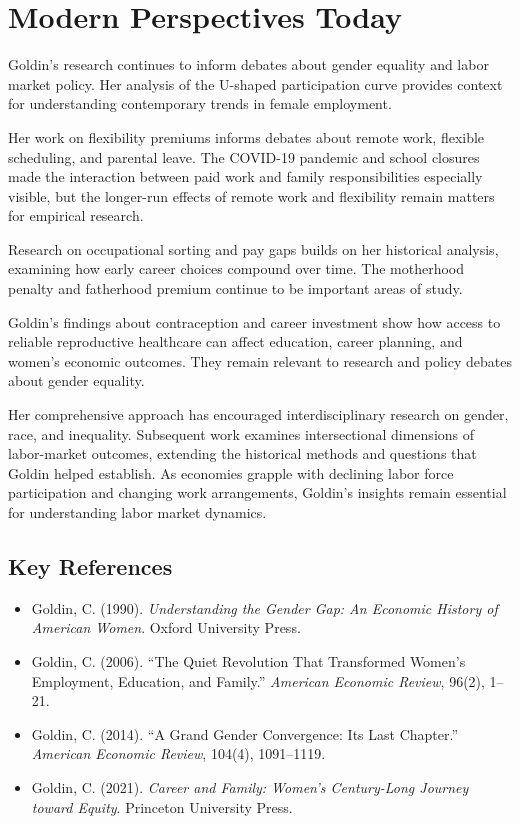 \section{Modern Perspectives Today}
Goldin's research continues to inform debates about gender equality and labor
market policy. Her analysis of the U-shaped participation curve provides
context for understanding contemporary trends in female employment.

Her work on flexibility premiums informs debates about remote work, flexible
scheduling, and parental leave. The COVID-19 pandemic and school closures made
the interaction between paid work and family responsibilities especially visible,
but the longer-run effects of remote work and flexibility remain matters for
empirical research.

Research on occupational sorting and pay gaps builds on her historical analysis,
examining how early career choices compound over time. The motherhood penalty
and fatherhood premium continue to be important areas of study.

Goldin's findings about contraception and career investment show how access to
reliable reproductive healthcare can affect education, career planning, and
women's economic outcomes. They remain relevant to research and policy debates
about gender equality.

Her comprehensive approach has encouraged interdisciplinary research on gender,
race, and inequality. Subsequent work examines intersectional dimensions of
labor-market outcomes, extending the historical methods and questions that
Goldin helped establish.
As economies grapple with declining labor force participation and changing work
arrangements, Goldin's insights remain essential for understanding labor market
dynamics.

\subsection*{Key References}
\begin{itemize}
    \item Goldin, C. (1990). \textit{Understanding the Gender Gap: An Economic History of American Women}. Oxford University Press.
    \item Goldin, C. (2006). ``The Quiet Revolution That Transformed Women's Employment, Education, and Family.'' \textit{American Economic Review}, 96(2), 1--21.
    \item Goldin, C. (2014). ``A Grand Gender Convergence: Its Last Chapter.'' \textit{American Economic Review}, 104(4), 1091--1119.
    \item Goldin, C. (2021). \textit{Career and Family: Women's Century-Long Journey toward Equity}. Princeton University Press.
\end{itemize}
